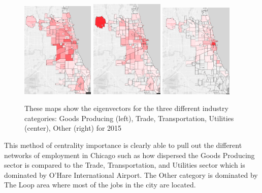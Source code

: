 \documentclass{article}
\theoremstyle{definition}
\theoremstyle{remark}
\begin{document}
\begin{figure}[H]
    \centering
    \includegraphics[width=0.31\textwidth]{Jobs-SI001-2015}
    \includegraphics[width=0.31\textwidth]{Jobs-SI002-2015}
    \includegraphics[width=0.31\textwidth]{Jobs-SI003-2015}
    \caption{These maps show the eigenvectors for the three different industry categories: Goods Producing (left), Trade, Transportation, Utilities (center), Other (right) for 2015}
    \label{fig:Jobs-S000-2008}
\end{figure}

This method of centrality importance is clearly able to pull out the different networks of employment in Chicago such as how dispersed the Goods Producing sector is compared to the Trade, Transportation, and Utilities sector which is dominated by O'Hare International Airport.  The Other category is dominated by The Loop area where most of the jobs in the city are located. \\
\end{document}
